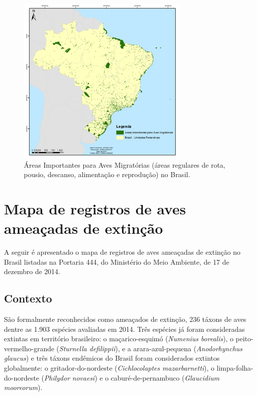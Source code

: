\documentclass[
  oneside]{scrbook}
\begin{document}
\begin{figure}

{\centering \includegraphics[width=0.8\linewidth]{imagens/figura02} 

}

\caption{Áreas Importantes para Aves Migratórias (áreas regulares de rota, pousio, descanso, alimentação e reprodução) no Brasil.}\label{fig:02}
\end{figure}

\hypertarget{mapa-ameacadas}{%
\section{Mapa de registros de aves ameaçadas de extinção}\label{mapa-ameacadas}}

A seguir é apresentado o mapa de registros de aves ameaçadas de extinção no Brasil listadas na Portaria 444, do Ministério do Meio Ambiente, de 17 de dezembro de 2014.

\hypertarget{contexto}{%
\subsection{Contexto}\label{contexto}}

São formalmente reconhecidos como ameaçados de extinção, 236 táxons de aves dentre as 1.903 espécies avaliadas em 2014. Três espécies já foram consideradas extintas em território brasileiro: o maçarico-esquimó (\emph{Numenius borealis}), o peito-vermelho-grande (\emph{Sturnella defilippii}), e a arara-azul-pequena (\emph{Anodorhynchus glaucus}) e três táxons endêmicos do Brasil foram considerados extintos globalmente: o gritador-do-nordeste (\emph{Cichlocolaptes mazarbarnetti}), o limpa-folha-do-nordeste (\emph{Philydor novaesi}) e o caburé-de-pernambuco (\emph{Glaucidium mooreorum}).
\end{document}

